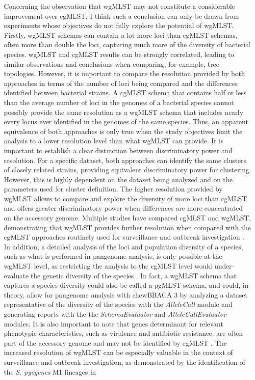 Concerning the observation that \ac{wgMLST} may not constitute a considerable improvement over \ac{cgMLST}, I think such a conclusion can only be drawn from experiments whose objectives do not fully explore the potential of \ac{wgMLST}. Firstly, \ac{wgMLST} schemas can contain a lot more loci than \ac{cgMLST} schemas, often more than double the loci, capturing much more of the diversity of bacterial species. \ac{wgMLST} and \ac{cgMLST} results can be strongly correlated, leading to similar observations and conclusions when comparing, for example, tree topologies. However, it is important to compare the resolution provided by both approaches in terms of the number of loci being compared and the differences identified between bacterial strains. A \ac{cgMLST} schema that contains half or less than the average number of loci in the genomes of a bacterial species cannot possibly provide the same resolution as a \ac{wgMLST} schema that includes nearly every locus ever identified in the genomes of the same species. Thus, an apparent equivalence of both approaches is only true when the study objectives limit the analysis to a lower resolution level than what \ac{wgMLST} can provide. It is important to establish a clear distinction between discriminatory power and resolution. For a specific dataset, both approaches can identify the same clusters of closely related strains, providing equivalent discriminatory power for clustering. However, this is highly dependent on the dataset being analyzed and on the parameters used for cluster definition. The higher resolution provided by \ac{wgMLST} allows to compare and explore the diversity of more loci than \ac{cgMLST} and offers greater discriminatory power when differences are more concentrated on the accessory genome. Multiple studies have compared \ac{cgMLST} and \ac{wgMLST}, demonstrating that \ac{wgMLST} provides further resolution when compared with the \ac{cgMLST} approaches routinely used for surveillance and outbreak investigation \cite{mixao_multi-country_2025, baktash_comparison_nodate, joseph_evaluation_2023, leeper_validation_2025}. In addition, a detailed analysis of the loci and population diversity of a species, such as what is performed in pangenome analysis, is only possible at the \ac{wgMLST} level, as restricting the analysis to the \ac{cgMLST} level would under-evaluate the genetic diversity of the species \cite{tettelin_genome_2005}. In fact, a \ac{wgMLST} schema that captures a species diversity could also be called a \ac{pgMLST} schema, and could, in theory, allow for pangenome analysis with chewBBACA 3 by analyzing a dataset representative of the diversity of the species with the \textit{AlleleCall} module and generating reports with the the \textit{SchemaEvaluator} and \textit{AlleleCallEvaluator} modules. It is also important to note that genes determinant for relevant phenotypic characteristics, such as virulence and antibiotic resistance, are often part of the accessory genome and may not be identified by \ac{cgMLST} \cite{holt_genomic_2015, jackson_influence_2011, darmancier_are_2022}. The increased resolution of \ac{wgMLST} can be especially valuable in the context of surveillance and outbreak investigation, as demonstrated by the identification of the \textit{S. pyogenes} M1 lineages in 